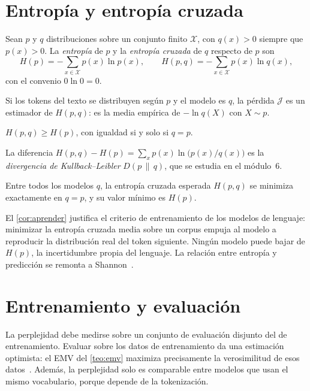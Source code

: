 \addtocounter{definicion}{1}%

\section{Entropía y entropía cruzada}

\begin{definicion}
Sean $p$ y $q$ distribuciones sobre un conjunto finito $\mathcal{X}$, con $q(x)>0$ siempre que $p(x)>0$. La \emph{entropía} de $p$ y la \emph{entropía cruzada} de $q$ respecto de $p$ son
\[
H(p)=-\sum_{x\in\mathcal{X}}p(x)\ln p(x),\qquad
H(p,q)=-\sum_{x\in\mathcal{X}}p(x)\ln q(x),
\]
con el convenio $0\ln 0=0$.
\end{definicion}

Si los tokens del texto se distribuyen según $p$ y el modelo es $q$, la pérdida $\mathcal{J}$ es un estimador de $H(p,q)$: es la media empírica de $-\ln q(X)$ con $X\sim p$.

\begin{teorema}\label{teo:gibbs}
$H(p,q)\ge H(p)$, con igualdad si y solo si $q=p$.
\end{teorema}

La diferencia $H(p,q)-H(p)=\sum_x p(x)\ln\bigl(p(x)/q(x)\bigr)$ es la \emph{divergencia de Kullback–Leibler} $D(p\,\|\,q)$, que se estudia en el módulo~6.

\begin{corolario}\label{cor:aprender}
Entre todos los modelos $q$, la entropía cruzada esperada $H(p,q)$ se minimiza exactamente en $q=p$, y su valor mínimo es $H(p)$.
\end{corolario}

El \cref{cor:aprender} justifica el criterio de entrenamiento de los modelos de lenguaje: minimizar la entropía cruzada media sobre un corpus empuja al modelo a reproducir la distribución real del token siguiente. Ningún modelo puede bajar de $H(p)$, la incertidumbre propia del lenguaje. La relación entre entropía y predicción se remonta a Shannon~\cite{shannon}.

\section{Entrenamiento y evaluación}

\begin{observacion}
La perplejidad debe medirse sobre un conjunto de evaluación disjunto del de entrenamiento. Evaluar sobre los datos de entrenamiento da una estimación optimista: el EMV del \cref{teo:emv} maximiza precisamente la verosimilitud de esos datos~\cite[§3.2]{jm3}. Además, la perplejidad solo es comparable entre modelos que usan el mismo vocabulario, porque depende de la tokenización.
\end{observacion}

